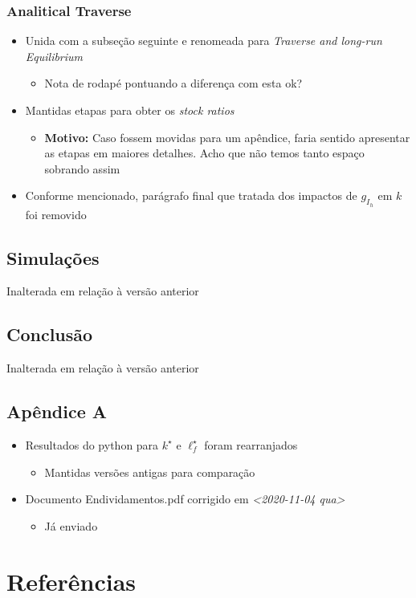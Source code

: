 \documentclass[11pt]{article}
\begin{document}
\subsubsection*{Analitical Traverse}
\label{sec:orgc5b55b8}

\begin{itemize}
\item Unida com a subseção seguinte e renomeada para \emph{Traverse and long-run Equilibrium}
\begin{itemize}
\item Nota de rodapé pontuando a diferença com \textcite{freitas_growth_2015} esta ok?
\end{itemize}
\item Mantidas etapas para obter os \emph{stock ratios}
\begin{itemize}
\item \textbf{Motivo:} Caso fossem movidas para um apêndice, faria sentido apresentar as etapas em maiores detalhes. Acho que não temos tanto espaço sobrando assim
\end{itemize}
\item Conforme mencionado, parágrafo final que tratada dos impactos de \(g_{I_h}\) em \(k\) foi removido
\end{itemize}
\subsection*{Simulações}
\label{sec:org04813b0}
Inalterada em relação à versão anterior
\subsection*{Conclusão}
\label{sec:org2e330ba}
Inalterada em relação à versão anterior
\subsection*{Apêndice A}
\label{sec:org5a4a2ac}

\begin{itemize}
\item Resultados do python para \(k^\star\) e \(\ell_f^\star\) foram rearranjados
\begin{itemize}
\item Mantidas versões antigas para comparação
\end{itemize}
\item Documento Endividamentos.pdf corrigido em \textit{<2020-11-04 qua>}
\begin{itemize}
\item Já enviado
\end{itemize}
\end{itemize}


\section*{Referências}
\label{sec:orgd24d272}
\printbibliography[heading=none]
\end{document}
